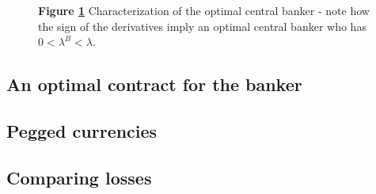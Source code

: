 \documentclass[12pt, a4paper]{article}
\begin{document}
\begin{spacing}{1.213}
\begin{figure}[h]
\centering
{}\label{fig: CB}
\begin{minipage}{0.8\textwidth} %
\def\svgwidth{\columnwidth}

{\footnotesize \textbf{Figure \ref{fig: CB}}
Characterization of the optimal central banker - note how the sign of the derivatives imply an optimal central banker who has $0 < \lambda^B < \lambda$.
\par}
\end{minipage}
\end{figure}

\subsection{An optimal contract for the banker}

\subsection{Pegged currencies}

\subsection{Comparing losses}

\end{spacing}
\end{document}
